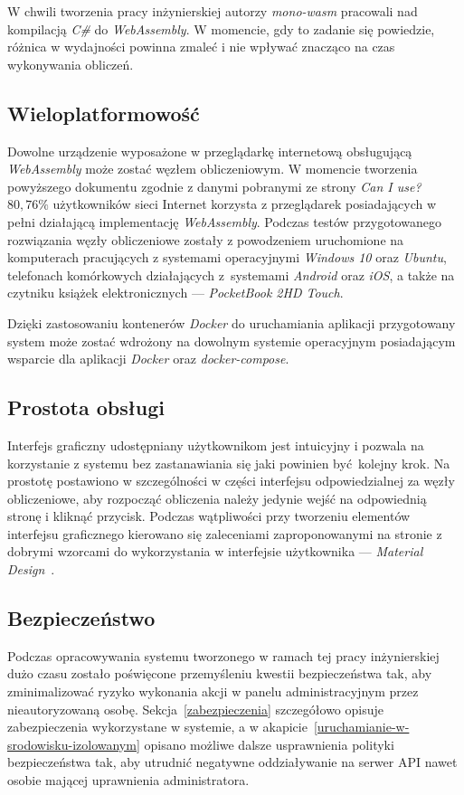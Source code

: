 \documentclass[a4paper,11pt,twoside]{report}
\theoremstyle{definition}
\begin{document}
            W chwili tworzenia pracy inżynierskiej autorzy \textit{mono-wasm} pracowali nad kompilacją \textit{C\#} do \textit{WebAssembly}. W momencie, gdy to zadanie się powiedzie, różnica w wydajności powinna zmaleć i nie wpływać znacząco na czas wykonywania obliczeń.
            
        \subsection{Wieloplatformowość}
            Dowolne urządzenie wyposażone w przeglądarkę internetową obsługującą \textit{WebAssembly} może zostać węzłem obliczeniowym.
            W momencie tworzenia powyższego dokumentu zgodnie z danymi pobranymi ze strony \textit{Can I use?}~\cite{can-i-use} $80,76\%$ użytkowników sieci Internet korzysta z przeglądarek posiadających w pełni działającą implementację \textit{WebAssembly}.
            Podczas testów przygotowanego rozwiązania węzły obliczeniowe zostały z powodzeniem uruchomione na komputerach pracujących z systemami operacyjnymi \textit{Windows 10} oraz \textit{Ubuntu}, telefonach komórkowych działających z~systemami \textit{Android} oraz \textit{iOS}, a także na czytniku książek elektronicznych --- \textit{PocketBook 2HD Touch}.
            
            Dzięki zastosowaniu kontenerów \textit{Docker} do uruchamiania aplikacji przygotowany system może zostać wdrożony na dowolnym systemie operacyjnym posiadającym wsparcie dla aplikacji \textit{Docker} oraz \textit{docker-compose}.
        
        \subsection{Prostota obsługi}
            Interfejs graficzny udostępniany użytkownikom jest intuicyjny i pozwala na korzystanie z systemu bez zastanawiania się jaki powinien być kolejny krok.
            Na prostotę postawiono w szczególności w części interfejsu odpowiedzialnej za węzły obliczeniowe, aby rozpocząć obliczenia należy jedynie wejść na odpowiednią stronę i kliknąć przycisk.
            Podczas wątpliwości przy tworzeniu elementów interfejsu graficznego kierowano się zaleceniami zaproponowanymi na stronie z dobrymi wzorcami do wykorzystania w interfejsie użytkownika --- \textit{Material Design}~\cite{material-design}.
        
        \subsection{Bezpieczeństwo}
            Podczas opracowywania systemu tworzonego w ramach tej pracy inżynierskiej dużo czasu zostało poświęcone przemyśleniu kwestii bezpieczeństwa tak, aby zminimalizować ryzyko wykonania akcji w panelu administracyjnym przez nieautoryzowaną osobę.
            Sekcja~\ref{zabezpieczenia} szczegółowo opisuje zabezpieczenia wykorzystane w systemie, a w akapicie~\ref{uruchamianie-w-srodowisku-izolowanym} opisano możliwe dalsze usprawnienia polityki bezpieczeństwa tak, aby utrudnić negatywne oddziaływanie na serwer API nawet osobie mającej uprawnienia administratora.
    
\end{document}
